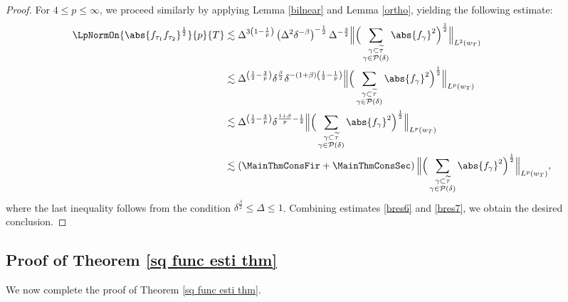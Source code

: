 \documentclass[reqno,centertags,11pt,a4paper]{amsart}
\begin{document}
\begin{proof}
For $4 \le p \le \infty$, we proceed similarly by applying Lemma \ref{bilnear} and Lemma \ref{ortho}, yielding the following estimate:
\begin{align}\label{bres7}
\nonumber\LpNormOn{\abs{f_{\tau_1}f_{\tau_2}}^{\frac{1}{2}}}{p}{{T}}
&\lesssim  \Delta^{3\left(1 - \frac{1}{p}\right)} \left(\Delta^2\delta^{-\beta}\right)^{-\frac{1}{2}} \Delta^{-\frac{3}{2}}
  \Big\| \Big(\sum_{\substack{\gamma \subset \widetilde{\tau}\\ \gamma \in \mathcal{P}(\delta)}} \abs{f_\gamma}^2 \Big)^{\frac{1}{2}} \Big\|_{L^2(w_{{T}})} \\
\nonumber&\lesssim \Delta^{\left(\frac{1}{2} - \frac{3}{p}\right)} \delta^{\frac{\beta}{2}} \delta^{-(1+\beta)\left(\frac{1}{2} - \frac{1}{p}\right)}
  \Big\| \Big(\sum_{\substack{\gamma \subset \widetilde{\tau} \\ \gamma \in \mathcal{P}(\delta)}} \abs{f_\gamma}^2 \Big)^{\frac{1}{2}} \Big\|_{L^p(w_{{T}})} \\
\nonumber&\lesssim \Delta^{\left(\frac{1}{2} - \frac{3}{p}\right)} \delta^{\frac{1+\beta}{p}  - \frac{1}{2}}
  \Big\| \Big(\sum_{\substack{\gamma \subset \widetilde{\tau} \\ \gamma \in \mathcal{P}(\delta)}} \abs{f_\gamma}^2 \Big)^{\frac{1}{2}} \Big\|_{L^p(w_{{T}})} \\
&\lesssim \left(\MainThmConsFir + \MainThmConsSec\right)
  \Big\| \Big(\sum_{\substack{\gamma \subset \widetilde{\tau} \\ \gamma \in \mathcal{P}(\delta)}} \abs{f_\gamma}^2 \Big)^{\frac{1}{2}} \Big\|_{L^p(w_{{T}})},
\end{align}
where the last inequality follows from the condition $\delta^{\frac{\beta}{2}} \le \Delta \le 1$.
Combining estimates \eqref{bres6} and \eqref{bres7}, we obtain the desired conclusion.
\end{proof}

\subsection{Proof of Theorem \ref{sq func esti thm}}
We now complete the proof of Theorem \ref{sq func esti thm}.
\end{document}
